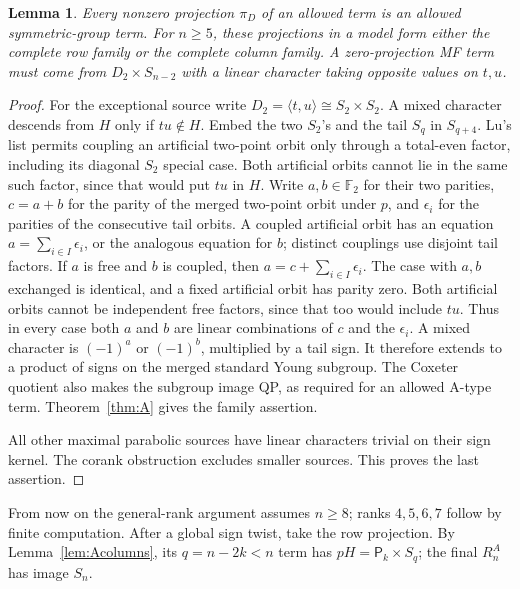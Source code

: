 \documentclass[11pt]{article}
\numberwithin{equation}{section}
\newtheorem{lemma}[theorem]{Lemma}
\theoremstyle{definition}
\newcommand{\F}{\mathbb F}
\newcommand{\pair}{\mathsf P}
\begin{document}
\begin{lemma}\label{lem:Dprojection}
Every nonzero projection \(\pi_D\) of an allowed term is an allowed symmetric-group term.
For \(n\geq5\), these projections in a model form either the complete row family or the complete column family.
A zero-projection MF term must come from \(D_2\times S_{n-2}\) with a linear character taking opposite values on \(t,u\).
\end{lemma}
\begin{proof}
For the exceptional source write \(D_2=\langle t,u\rangle\cong S_2\times S_2\).
A mixed character descends from \(H\) only if \(tu\notin H\).
Embed the two \(S_2\)'s and the tail \(S_q\) in \(S_{q+4}\).
Lu's list permits coupling an artificial two-point orbit only through a total-even factor, including its diagonal \(S_2\) special case.
Both artificial orbits cannot lie in the same such factor, since that would put \(tu\) in \(H\).
Write \(a,b\in\F_2\) for their two parities, \(c=a+b\) for the parity of the merged two-point orbit under \(p\), and \(\epsilon_i\) for the parities of the consecutive tail orbits.
A coupled artificial orbit has an equation \(a=\sum_{i\in I}\epsilon_i\), or the analogous equation for \(b\); distinct couplings use disjoint tail factors.
If \(a\) is free and \(b\) is coupled, then \(a=c+\sum_{i\in I}\epsilon_i\).
The case with \(a,b\) exchanged is identical, and a fixed artificial orbit has parity zero.
Both artificial orbits cannot be independent free factors, since that too would include \(tu\).
Thus in every case both \(a\) and \(b\) are linear combinations of \(c\) and the \(\epsilon_i\).
A mixed character is \((-1)^a\) or \((-1)^b\), multiplied by a tail sign.
It therefore extends to a product of signs on the merged standard Young subgroup.
The Coxeter quotient also makes the subgroup image QP, as required for an allowed A-type term.
Theorem~\ref{thm:A} gives the family assertion.

All other maximal parabolic sources have linear characters trivial on their sign kernel.
The corank obstruction excludes smaller sources.
This proves the last assertion.
\end{proof}

From now on the general-rank argument assumes \(n\geq8\); ranks \(4,5,6,7\) follow by finite computation.
After a global sign twist, take the row projection.
By Lemma~\ref{lem:Acolumns}, its \(q=n-2k<n\) term has
\(pH=\pair_k\times S_q\); the final \(R_n^A\) has image \(S_n\).
\end{document}
